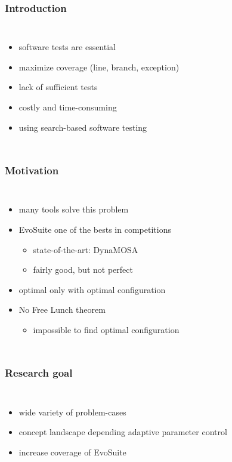 \begin{frame}
	\frametitle{Introduction}
	
	\begin{columns}[c]
		
		\column{\textwidth}
		\begin{itemize}
			\item software tests are essential
			\item maximize coverage (line, branch, exception)
			\item lack of sufficient tests
			\item costly and time-consuming
			\item using search-based software testing
		\end{itemize}
		
	\end{columns}
	
\end{frame}

\begin{frame}
	\frametitle{Motivation}
	
	\begin{columns}[c]
		
		\column{\textwidth}
		\begin{itemize}
			\item many tools solve this problem
			\item EvoSuite one of the bests in competitions \cite{Panichella.2020}
			\begin{itemize}
				\item state-of-the-art: DynaMOSA  
				\item fairly good, but not perfect \cite{Arcuri.2014}
			\end{itemize}
			\item optimal only with optimal configuration
			\item No Free Lunch theorem \cite{Wolpert.1997}
				\begin{itemize}
					\item impossible to find optimal configuration
				\end{itemize}
		\end{itemize}
		
	\end{columns}
	
\end{frame}

\begin{frame}
	\frametitle{Research goal}
	
	\begin{columns}[c]
		
		\column{\textwidth}
		\begin{itemize}
			\item wide variety of problem-cases
			\item concept landscape depending adaptive parameter control
			\item increase coverage of EvoSuite
		\end{itemize}
		
	\end{columns}
	
\end{frame}

